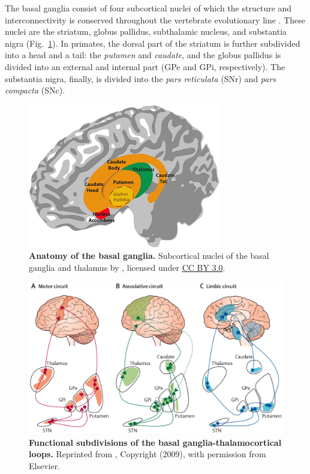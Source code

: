 %
The basal ganglia consist of four subcortical nuclei of which the structure
and interconnectivity is conserved throughout the vertebrate evolutionary
line \cite{grillner_basal_2016}. %
These nuclei are the striatum, globus pallidus, subthalamic nucleus, and substantia nigra
(Fig.~\ref{fig:bg_anatomy}). In primates, the dorsal
part of the striatum is further subdivided into a head and a tail: the \textit{putamen} and
\textit{caudate}, and the globus pallidus is divided into an external and internal part
(GPe and GPi, respectively). The substantia nigra, finally, is divided into the
\textit{pars reticulata} (SNr) and \textit{pars compacta} (SNc).
%


%
\begin{figure}
%
\centering
\includegraphics[width=0.75\textwidth]{ch_background_literature/figs/BG_anatomy_wikicommons.jpg}
\caption{
\textbf{Anatomy of the basal ganglia.}
Subcortical nuclei of the basal ganglia and thalamus by \cite{lim_how_2014}, licensed under \href{https://creativecommons.org/licenses/by/3.0/deed.en}{CC BY 3.0}.
%
%
%
}
\label{fig:bg_anatomy}
\end{figure}

%
\begin{figure}
\centering
\includegraphics[width=\textwidth]{ch_background_literature/figs/BG_loops-cognitive.png}
\caption{
\textbf{Functional subdivisions of the basal ganglia-thalamocortical loops.}
Reprinted from \cite{rodriguez-oroz_initial_2009}, Copyright (2009), with permission from Elsevier.
}
\label{fig:bg_loops-subdivisions}
\end{figure}


